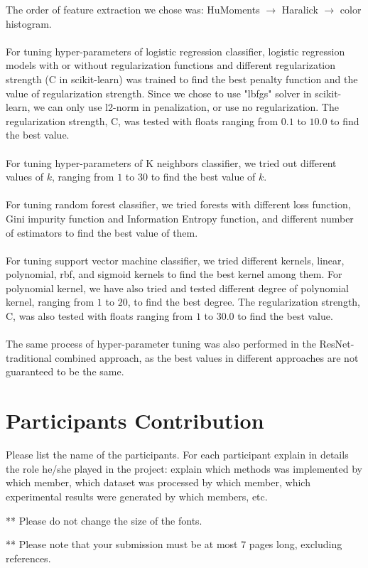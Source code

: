 \documentclass[11.5pt]{article}
\begin{document}
    The order of feature extraction we chose was: HuMoments $\rightarrow$ Haralick $\rightarrow$ color histogram.\\ \\
    For tuning hyper-parameters of logistic regression classifier, logistic regression models with or without regularization functions and different regularization strength (C in scikit-learn) was trained to find the best penalty function and the value of regularization strength.
    Since we chose to use "lbfgs" solver in scikit-learn, we can only use l2-norm in penalization, or use no regularization.
    The regularization strength, C, was tested with floats ranging from $0.1$ to $10.0$ to find the best value.\\ \\
    For tuning hyper-parameters of K neighbors classifier, we tried out different values of $k$, ranging from $1$ to $30$ to find the best value of $k$.\\ \\
    For tuning random forest classifier, we tried forests with different loss function, Gini impurity function and Information Entropy function, and different number of estimators to find the best value of them.\\ \\
    For tuning support vector machine classifier, we tried different kernels, linear, polynomial, rbf, and sigmoid kernels to find the best kernel among them.
    For polynomial kernel, we have also tried and tested different degree of polynomial kernel, ranging from $1$ to $20$, to find the best degree.
    The regularization strength, C, was also tested with floats ranging from $1$ to $30.0$ to find the best value.\\ \\
    The same process of hyper-parameter tuning was also performed in the ResNet-traditional combined approach, as the best values in different approaches are not guaranteed to be the same.


    \section{Participants Contribution}
    Please list the name of the participants. For each participant explain in details the role he/she played in the project: explain which methods was implemented by which member, which dataset was processed by which member, which experimental results were generated by which members, etc.

    \vspace{10mm}
    ** Please do not change the size of the fonts.

    ** Please note that your submission must be at most 7 pages long, excluding references.
\end{document}
